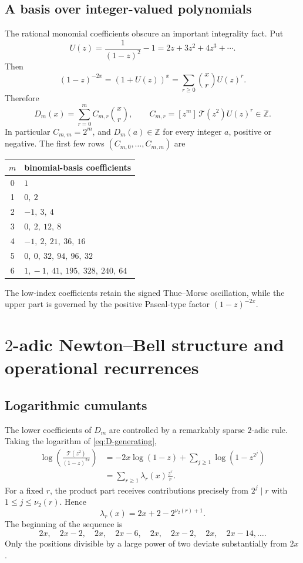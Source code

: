 \documentclass[11pt,oneside]{article}
\theoremstyle{definition}
\theoremstyle{remark}
\newcommand{\Z}{\mathbb Z}
\newcommand{\Diag}{D}
\newcommand{\TM}{\mathcal T}
\newcommand{\coeff}[2]{[z^{#1}]\,#2}
\newcommand{\vtwo}{\nu_{2}}
\begin{document}
\subsection{A basis over integer-valued polynomials}

The rational monomial coefficients obscure an important integrality fact.
Put
\[
 U(z)=\frac{1}{(1-z)^2}-1=2z+3z^2+4z^3+\cdots.
\]
Then
\[
 (1-z)^{-2x}=(1+U(z))^x
 =\sum_{r\ge0}\binom xrU(z)^r.
\]
Therefore
\begin{equation}
 \Diag_m(x)=\sum_{r=0}^{m}C_{m,r}\binom xr,
 \qquad
 C_{m,r}=\coeff{m}{\TM(z^2)U(z)^r}\in\Z.
 \label{eq:binomial-basis}
\end{equation}
In particular $C_{m,m}=2^m$, and $\Diag_m(a)\in\Z$ for every integer
$a$, positive or negative.  The first few rows $(C_{m,0},\ldots,C_{m,m})$
are
\begin{center}
\small
\begin{tabular}{c@{\qquad}l}
\toprule
$m$ & binomial-basis coefficients \\
\midrule
0 & $1$\\
1 & $0,\ 2$\\
2 & $-1,\ 3,\ 4$\\
3 & $0,\ 2,\ 12,\ 8$\\
4 & $-1,\ 2,\ 21,\ 36,\ 16$\\
5 & $0,\ 0,\ 32,\ 94,\ 96,\ 32$\\
6 & $1,\!-1,\ 41,\ 195,\ 328,\ 240,\ 64$\\
\bottomrule
\end{tabular}
\end{center}
The low-index coefficients retain the signed Thue--Morse oscillation, while
the upper part is governed by the positive Pascal-type factor
$(1-z)^{-2x}$.

\section{\texorpdfstring{$2$-adic}{2-adic} Newton--Bell structure and operational recurrences}
\label{sec:bell}

\subsection{Logarithmic cumulants}

The lower coefficients of $\Diag_m$ are controlled by a remarkably sparse
$2$-adic rule.  Taking the logarithm of \eqref{eq:D-generating},
\begin{align*}
 \log\!\left(\frac{\TM(z^2)}{(1-z)^{2x}}\right)
 &=-2x\log(1-z)+\sum_{j\ge1}\log(1-z^{2^j})\\
 &=\sum_{r\ge1}\lambda_r(x)\frac{z^r}{r}.
\end{align*}
For a fixed $r$, the product part receives contributions precisely from
$2^j\mid r$ with $1\le j\le\vtwo(r)$.  Hence
\begin{equation}
 \boxed{\quad
 \lambda_r(x)=2x+2-2^{\vtwo(r)+1}.
 \quad}
 \label{eq:lambda}
\end{equation}
The beginning of the sequence is
\[
 2x,\quad 2x-2,\quad 2x,\quad 2x-6,\quad
 2x,\quad 2x-2,\quad 2x,\quad 2x-14,\ldots.
\]
Only the positions divisible by a large power of two deviate substantially
from $2x$.
\end{document}
